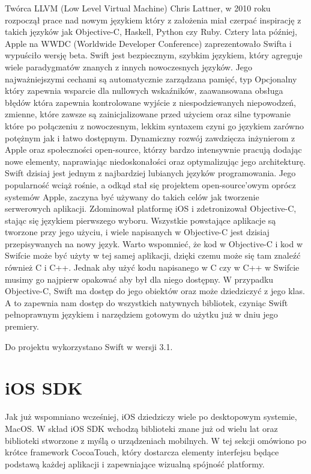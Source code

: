 Twórca LLVM (Low Level Virtual Machine) Chris Lattner, w 2010 roku rozpoczął prace nad nowym językiem który z założenia miał czerpać inspirację z takich języków jak Objective-C, Haskell, Python czy Ruby. Cztery lata później, Apple na WWDC (Worldwide Developer Conference) zaprezentowało Swifta i wypuściło wersję beta. Swift jest bezpiecznym, szybkim językiem, który agreguje wiele paradygmatów znanych z innych nowoczesnych języków. Jego najważniejszymi cechami są automatycznie zarządzana pamięć, typ Opcjonalny który zapewnia wsparcie dla nullowych wskaźników, zaawansowana obsługa błędów która zapewnia kontrolowane wyjście z niespodziewanych niepowodzeń, zmienne, które zawsze są zainicjalizowane przed użyciem oraz silne typowanie które po połączeniu z nowoczesnym, lekkim syntaxem czyni go językiem zarówno potężnym jak i łatwo dostępnym. Dynamiczny rozwój zawdzięcza inżynierom z Apple oraz społeczności open-source, którzy bardzo intensywnie pracują dodając nowe elementy, naprawiając niedoskonałości oraz optymalizując jego architekturę. Swift dzisiaj jest jednym z najbardziej lubianych języków programowania. Jego popularność wciąż rośnie, a odkąd stał się projektem open-source'owym oprócz systemów Apple, zaczyna być używany do takich celów jak tworzenie serwerowych aplikacji. Zdominował platformę iOS i zdetronizował Objective-C, stając się językiem pierwszego wyboru. Wszystkie powstające aplikacje są tworzone przy jego użyciu, i wiele napisanych w Objective-C jest dzisiaj przepisywanych na nowy język. Warto wspomnieć, że kod w Objective-C i kod w Swifcie może być użyty w tej samej aplikacji, dzięki czemu może się tam znaleźć również C i C++. Jednak aby użyć kodu napisanego w C czy w C++ w Swifcie musimy go najpierw opakować aby był dla niego dostępny. W przypadku Objective-C, Swift ma dostęp do jego obiektów oraz może dziedziczyć z jego klas. A to zapewnia nam dostęp do wszystkich natywnych bibliotek, czyniąc Swift pełnoprawnym językiem i narzędziem gotowym do użytku już w dniu jego premiery.

Do projektu wykorzystano Swift w wersji 3.1.

\section{iOS SDK}

Jak już wspomniano wcześniej, iOS dziedziczy wiele po desktopowym systemie, MacOS. W skład iOS SDK wchodzą biblioteki znane już od wielu lat oraz biblioteki stworzone z myślą o urządzeniach mobilnych. W tej sekcji omówiono po krótce framework CocoaTouch, który dostarcza elementy interfejsu będące podstawą każdej aplikacji i zapewniające wizualną spójność platformy.

